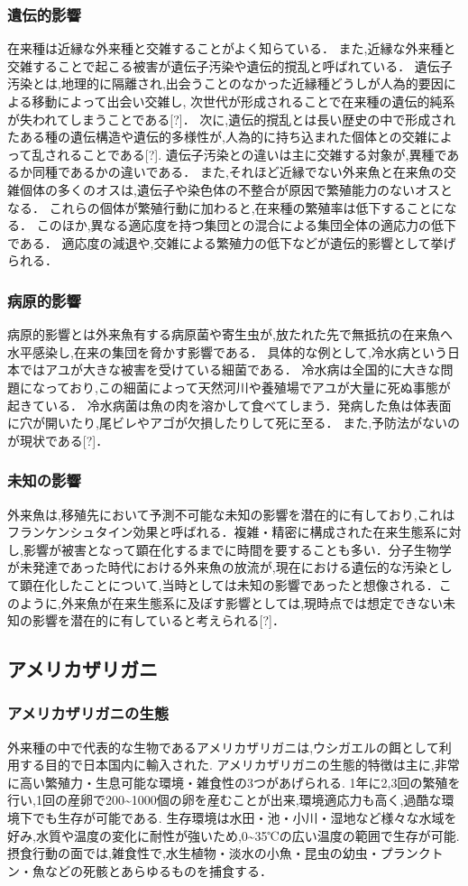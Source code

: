 \documentclass[12pt,a4j,titlepage]{ltjsarticle}
\begin{document}
\subsubsection{遺伝的影響}
在来種は近縁な外来種と交雑することがよく知らている．
また,近縁な外来種と交雑することで起こる被害が遺伝子汚染や遺伝的撹乱と呼ばれている．
遺伝子汚染とは,地理的に隔離され,出会うことのなかった近縁種どうしが人為的要因による移動によって出会い交雑し,
次世代が形成されることで在来種の遺伝的純系が失われてしまうことである[?]．
次に,遺伝的撹乱とは長い歴史の中で形成されたある種の遺伝構造や遺伝的多様性が,人為的に持ち込まれた個体との交雑によって乱されることである[?].
遺伝子汚染との違いは主に交雑する対象が,異種であるか同種であるかの違いである．
また,それほど近縁でない外来魚と在来魚の交雑個体の多くのオスは,遺伝子や染色体の不整合が原因で繁殖能力のないオスとなる．
これらの個体が繁殖行動に加わると,在来種の繁殖率は低下することになる．
このほか,異なる適応度を持つ集団との混合による集団全体の適応力の低下である．
適応度の減退や,交雑による繁殖力の低下などが遺伝的影響として挙げられる．
\subsubsection{病原的影響}
病原的影響とは外来魚有する病原菌や寄生虫が,放たれた先で無抵抗の在来魚へ水平感染し,在来の集団を脅かす影響である．
具体的な例として,冷水病という日本ではアユが大きな被害を受けている細菌である．
冷水病は全国的に大きな問題になっており,この細菌によって天然河川や養殖場でアユが大量に死ぬ事態が起きている．
冷水病菌は魚の肉を溶かして食べてしまう．発病した魚は体表面に穴が開いたり,尾ビレやアゴが欠損したりして死に至る．
また,予防法がないのが現状である[?]．
\subsubsection{未知の影響}
外来魚は,移殖先において予測不可能な未知の影響を潜在的に有しており,これはフランケンシュタイン効果と呼ばれる．複雑・精密に構成された在来生態系に対し,影響が被害となって顕在化するまでに時間を要することも多い．分子生物学が未発達であった時代における外来魚の放流が,現在における遺伝的な汚染として顕在化したことについて,当時としては未知の影響であったと想像される．このように,外来魚が在来生態系に及ぼす影響としては,現時点では想定できない未知の影響を潜在的に有していると考えられる[?]．
\subsection{アメリカザリガニ}
\subsubsection{アメリカザリガニの生態}
外来種の中で代表的な生物であるアメリカザリガニは,ウシガエルの餌として利用する目的で日本国内に輸入された.
アメリカザリガニの生態的特徴は主に,非常に高い繁殖力・生息可能な環境・雑食性の3つがあげられる.
1年に2,3回の繁殖を行い,1回の産卵で200\textasciitilde1000個の卵を産むことが出来,環境適応力も高く,過酷な環境下でも生存が可能である.
生存環境は水田・池・小川・湿地など様々な水域を好み,水質や温度の変化に耐性が強いため,0\textasciitilde35℃の広い温度の範囲で生存が可能.
摂食行動の面では,雑食性で,水生植物・淡水の小魚・昆虫の幼虫・プランクトン・魚などの死骸とあらゆるものを捕食する．
\end{document}
